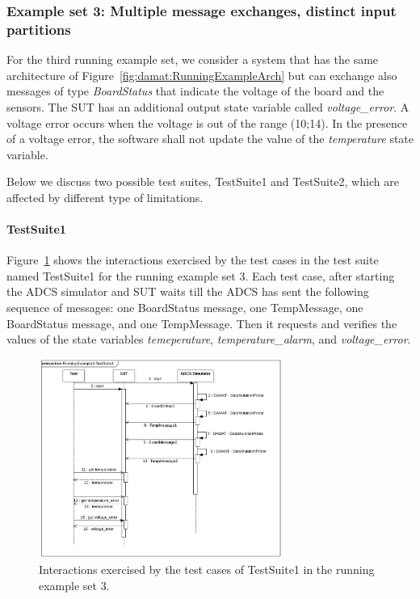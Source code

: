 \clearpage 
\subsubsection{Example set 3: Multiple message exchanges, distinct input partitions}
\label{sec:dataDriven:example:3}

For the third running example set, we consider a system that has the same architecture of  Figure~\ref{fig:damat:RunningExampleArch} but can exchange also messages of type \emph{BoardStatus} that indicate the voltage of the board and the sensors. The SUT has an additional output state variable called \emph{voltage\_error}. A voltage error occurs when the voltage is out of the range (10;14). In the presence of a voltage error, the software shall not update the value of the \emph{temperature} state variable.

Below we discuss two possible test suites, TestSuite1 and TestSuite2, which are affected by different type of limitations.

\paragraph{TestSuite1}

Figure~\ref{fig:damat:RunningExample3Sequence} shows the interactions exercised by the test cases in the test suite named TestSuite1 for the running example set 3. Each test case, after starting the ADCS simulator and SUT waits till the ADCS has sent the following sequence of messages: one BoardStatus message, one TempMessage, one BoardStatus message, and one TempMessage. Then it requests and verifies the values of the state variables \emph{temeperature}, \emph{temperature\_alarm}, and \emph{voltage\_error}.

\begin{figure}[tb]
\centering
\includegraphics[width=8cm]{damat/images/RunningExampleSequence3.png}
\caption{Interactions exercised by the test cases of TestSuite1 in the running example set 3.}
\label{fig:damat:RunningExample3Sequence}
\end{figure}

